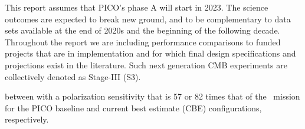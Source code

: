 \documentclass[PICOReport.tex]{subfiles}
\begin{document}
This report assumes that PICO's phase A will start in 2023. The science outcomes are expected to break new ground, and to be complementary to data sets available at the end of 2020s and the beginning of the following decade. Throughout the report we are including performance comparisons to funded projects that are in implementation and for which final design specifications and projections exist in the literature. Such next generation CMB experiments are collectively denoted as Stage-III (S3). %



between with a polarization sensitivity that is 57 or 82 times that of the \planck\ mission for the PICO baseline and current best estimate (\ac{CBE}) configurations, respectively. 



\end{document}
